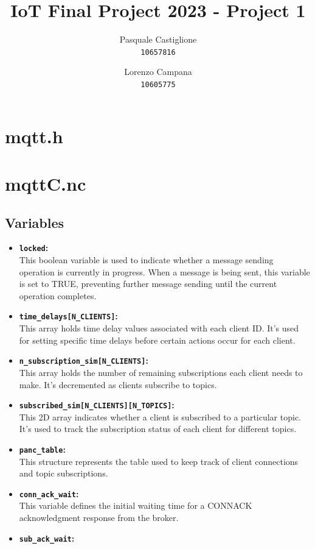 \documentclass[11pt]{article}
\title{\textbf{IoT Final Project 2023 - Project 1}}
\author{
  Pasquale Castiglione\\
	\texttt{10657816}
  \and
  Lorenzo Campana\\
  \texttt{10605775}
}
\date{}
\begin{document}
\maketitle
\section*{mqtt.h}
\section*{mqttC.nc}

\subsection*{Variables}
\begin{itemize}
\item{\textbf{\texttt{locked}:}}\\
This boolean variable is used to indicate whether a message sending operation is currently in progress. When a message is being sent, this variable is set to TRUE, preventing further message sending until the current operation completes.
\item{\textbf{\texttt{time\_delays[N\_CLIENTS]}:}}\\
This array holds time delay values associated with each client ID. It's used for setting specific time delays before certain actions occur for each client.
\item{\textbf{\texttt{n\_subscription\_sim[N\_CLIENTS]}:}}\\
This array holds the number of remaining subscriptions each client needs to make. It's decremented as clients subscribe to topics.
\item{\textbf{\texttt{subscribed\_sim[N\_CLIENTS][N\_TOPICS]}:}}\\
This 2D array indicates whether a client is subscribed to a particular topic. It's used to track the subscription status of each client for different topics.
\item{\textbf{\texttt{panc\_table}:}}\\
This structure represents the table used to keep track of client connections and topic subscriptions.
\item{\textbf{\texttt{conn\_ack\_wait}:}}\\
This variable defines the initial waiting time for a CONNACK acknowledgment response from the broker. 
\item{\textbf{\texttt{sub\_ack\_wait}:}}\\

\end{itemize}
\end{document}
